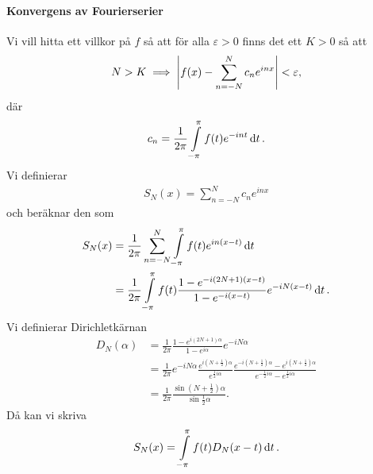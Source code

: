 \paragraph{Konvergens av Fourierserier}

\proof
Vi vill hitta ett villkor på $f$ så att för alla $\varepsilon > 0$ finns det ett $K > 0$ så att
\begin{align*}
	N > K \implies \abs{f(x) - \sum\limits_{n = -N}^{N}c_{n}e^{inx}} < \varepsilon,
\end{align*}
där
\begin{align*}
	c_{n} = \frac{1}{2\pi}\int\limits_{-\pi}^{\pi}f(t)e^{-int}\dd{t}.
\end{align*}
Vi definierar
\begin{align*}
	S_{N}(x) = \sum\limits_{n = -N}^{N}c_{n}e^{inx}
\end{align*}
och beräknar den som
\begin{align*}
	S_{N}(x) &= \frac{1}{2\pi}\sum\limits_{n = -N}^{N}\int\limits_{-\pi}^{\pi}f(t)e^{in(x - t)}\dd{t} \\
	         &= \frac{1}{2\pi}\int\limits_{-\pi}^{\pi}f(t)\frac{1 - e^{-i(2N + 1)(x - t)}}{1 - e^{-i(x - t)}}e^{-iN(x - t)}\dd{t}.
\end{align*}
Vi definierar Dirichletkärnan
\begin{align*}
	D_{N}(\alpha) &= \frac{1}{2\pi}\frac{1 - e^{i(2N + 1)\alpha}}{1 - e^{i\alpha}}e^{-iN\alpha} \\
	              &= \frac{1}{2\pi}e^{-iN\alpha}\frac{e^{i\left(N + \frac{1}{2}\right)\alpha}}{e^{\frac{1}{2}i\alpha}}\frac{e^{-i\left(N + \frac{1}{2}\right)\alpha} - e^{i\left(N + \frac{1}{2}\right)\alpha}}{e^{-\frac{1}{2}i\alpha} - e^{\frac{1}{2}i\alpha}} \\
	              &= \frac{1}{2\pi}\frac{\sin{\left(N + \frac{1}{2}\right)\alpha}}{\sin{\frac{1}{2}\alpha}}.
\end{align*}
Då kan vi skriva
\begin{align*}
	S_{N}(x) = \int\limits_{-\pi}^{\pi}f(t)D_{N}(x - t)\dd{t}.
\end{align*}